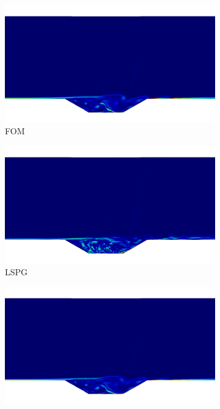 \begin{figure}
\begin{center}
\begin{subfigure}[t]{0.49\textwidth}
\includegraphics[trim={10cm 3cm 10cm 12cm},clip,width=1.0\linewidth]{figs/cavity_new/vort_fom_t50.png}
\caption{FOM}
\end{subfigure}
\begin{subfigure}[t]{0.49\textwidth}
\includegraphics[trim={10cm 3cm 10cm 12cm},clip,width=1.0\linewidth]{figs/cavity_new/vort_wls_numStepsInWindow_1_t50.png}
\caption{LSPG}
\end{subfigure}
\begin{subfigure}[t]{0.49\textwidth}
\includegraphics[trim={10cm 3cm 10cm 12cm},clip,width=1.0\linewidth]{figs/cavity_new/vort_wls_numStepsInWindow_5_t50.png}

\end{subfigure}
\end{center}
\end{figure}
